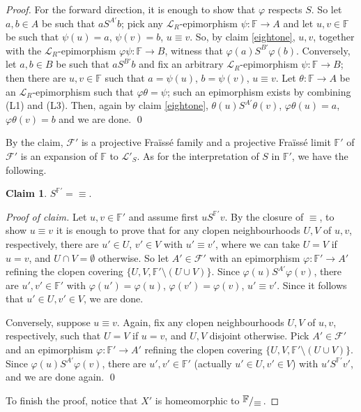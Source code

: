 \documentclass[12pt,twoside,a4paper]{amsart}
\theoremstyle{plain}
\theoremstyle{definition}
\newtheorem{claim}{Claim}[theorem]
\begin{document}
\begin{proof}
For the forward direction, it is enough to show that $ {\varphi} $ respects $S$.
So let $a,b\in A$ be such that $aS^{A'}b$; pick any $ \mathcal L_R$-epimorphism $\psi : \mathbb F \to A$ and let $u,v\in \mathbb F $ be such that $\psi (u)=a$, $\psi (v)=b$, $u\equiv v$.
So, by claim \ref{eightone}, $u,v$, together with the $ \mathcal L_R$-epimorphism $ {\varphi} \psi : \mathbb F \to B$, witness that $ {\varphi} (a)S^{B'} {\varphi} (b)$.
Conversely, let $a,b\in B$ be such that $aS^{B'}b$ and fix an arbitrary $ \mathcal L_R$-epimorphism $\psi : \mathbb F \to B$; then there are $u,v\in \mathbb F $ such that $a=\psi (u)$, $b=\psi (v)$, $u\equiv v$.
Let $\theta : \mathbb F \to A$ be an $ \mathcal L_R$-epimorphism such that $ {\varphi} \theta =\psi $; such an epimorphism exists by combining (L1) and (L3).
Then, again by claim \ref{eightone}, $\theta (u)S^{A'}\theta (v)$, $ {\varphi} \theta (u)=a$, $ {\varphi} \theta (v)=b$ and we are done.
\qed

\medskip
By the claim, $ \mathcal F'$ is a projective Fra\"iss\'e family and a projective Fra\"iss\'e limit $ \mathbb F'$ of $ \mathcal F'$ is an expansion of $ \mathbb F $ to $ \mathcal L'_S$.
As for the interpretation of $S$ in $ \mathbb F'$, we have the following.

\begin{claim}
$S^{ \mathbb F'}={\equiv} $.
\end{claim}

{\it Proof of claim.}
Let $u,v\in\mathbb F'$ and assume first $uS^{ \mathbb F'}v$.
By the closure of $\equiv $, to show $u\equiv v$ it is enough to prove that for any clopen neighbourhoods $U,V$ of $u,v$, respectively, there are $u'\in U$, $v'\in V$ with $u'\equiv v'$, where we can take $U=V$ if $u=v$, and $U\cap V=\emptyset $ otherwise.
So let $A'\in \mathcal F'$ with an epimorphism $ {\varphi} : \mathbb F'\to A'$ refining the clopen covering $\{U,V, \mathbb F'\setminus(U\cup V)\} $.
Since $ {\varphi} (u)S^{A'} {\varphi} (v)$, there are $u',v'\in \mathbb F'$ with $ {\varphi} (u')= {\varphi} (u)$, $ {\varphi}(v')= {\varphi} (v)$, $u'\equiv v'$. Since it follows that $u'\in U,v'\in V$, we are done.

Conversely, suppose $u\equiv v$.
Again, fix any clopen neighbourhoods $U,V$ of $u,v$, respectively, such that $U=V$ if $u=v$, and $U,V$ disjoint otherwise.
Pick $A'\in \mathcal F'$ and an epimorphism $ {\varphi} : \mathbb F' \to A'$ refining the clopen covering $\{ U,V, \mathbb F' \setminus (U\cup V)\} $.
Since $ {\varphi} (u)S^{A'} {\varphi} (v)$, there are $u',v'\in \mathbb F'$ (actually $u'\in U,v'\in V$) with $u'S^{ \mathbb F'}v'$, and we are done again.
\qed

\medskip
To finish the proof, notice that $X'$ is homeomorphic to $ {{\raisebox{.2em}{${ \mathbb F }\!$}\left/\raisebox{-.2em}{${\equiv }$}\right.}} $.
\end{proof}
\end{document}
